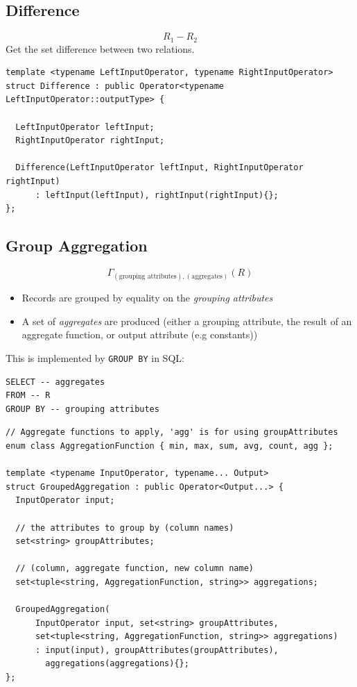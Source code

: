 \subsection{Difference}
\[R_1 - R_2\]
Get the set difference between two relations.

\begin{verbatim}
template <typename LeftInputOperator, typename RightInputOperator>
struct Difference : public Operator<typename LeftInputOperator::outputType> {

  LeftInputOperator leftInput;
  RightInputOperator rightInput;
  
  Difference(LeftInputOperator leftInput, RightInputOperator rightInput)
      : leftInput(leftInput), rightInput(rightInput){};
};
\end{verbatim}

\subsection{Group Aggregation}
\[\Gamma_{(\text{grouping attributes}),(\text{aggregates})}(R)\]
\begin{itemize}
  \item Records are grouped by equality on the \textit{grouping attributes}
  \item A set of \textit{aggregates} are produced (either a grouping attribute, the result of an aggregate function, or output attribute (e.g constants))
\end{itemize}

This is implemented by \texttt{GROUP BY} in SQL:
\begin{verbatim}
SELECT -- aggregates
FROM -- R
GROUP BY -- grouping attributes
\end{verbatim}

\begin{verbatim}
// Aggregate functions to apply, 'agg' is for using groupAttributes
enum class AggregationFunction { min, max, sum, avg, count, agg };

template <typename InputOperator, typename... Output>
struct GroupedAggregation : public Operator<Output...> {  
  InputOperator input;

  // the attributes to group by (column names)
  set<string> groupAttributes;

  // (column, aggregate function, new column name)
  set<tuple<string, AggregationFunction, string>> aggregations;

  GroupedAggregation(
      InputOperator input, set<string> groupAttributes,
      set<tuple<string, AggregationFunction, string>> aggregations)
      : input(input), groupAttributes(groupAttributes),
        aggregations(aggregations){};
};
\end{verbatim}

